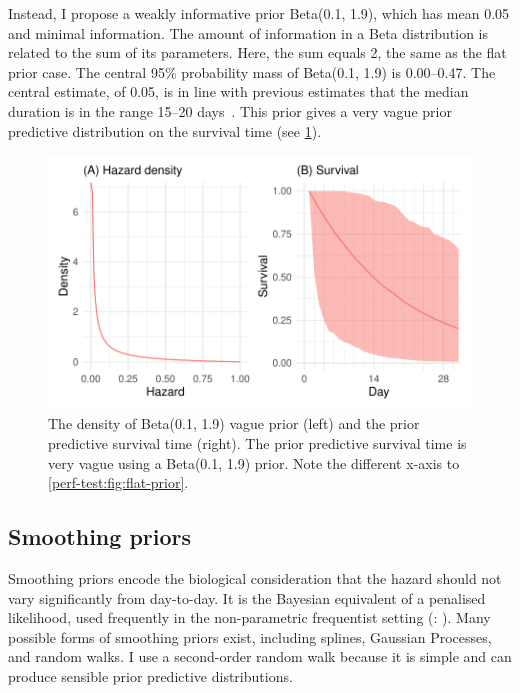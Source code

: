 \documentclass[thesis.tex]{subfiles}
\begin{document}
Instead, I propose a weakly informative prior Beta(0.1, 1.9), which has mean 0.05 and minimal information.
The amount of information in a Beta distribution is related to the sum of its parameters.
Here, the sum equals 2, the same as the flat prior case.
The central 95\% probability mass of Beta(0.1, 1.9) is 0.00--0.47.
The central estimate, of 0.05, is in line with previous estimates that the median duration is in the range 15--20 days~\autocite{cevikShedding}.
This prior gives a very vague prior predictive distribution on the survival time (see \cref{perf-test:fig:vague-prior}).
\begin{figure}
  \centering \includegraphics{cis-perfect-testing/vague-prior}
  \caption[Weakly informative priors for the hazard]{The density of Beta(0.1, 1.9) vague prior (left) and the prior predictive survival time (right). The prior predictive survival time is very vague using a Beta(0.1, 1.9) prior. Note the different x-axis to \cref{perf-test:fig:flat-prior}. \label{perf-test:fig:vague-prior}}
\end{figure}


\subsection{Smoothing priors}

Smoothing priors encode the biological consideration that the hazard should not vary significantly from day-to-day.
It is the Bayesian equivalent of a penalised likelihood, used frequently in the non-parametric frequentist setting (\eg: \autocite{bacchettiNonparametric}).
Many possible forms of smoothing priors exist, including splines, Gaussian Processes, and random walks.
I use a second-order random walk because it is simple and can produce sensible prior predictive distributions.
\end{document}
